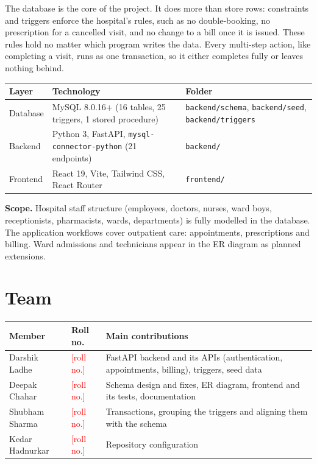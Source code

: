 \documentclass[11pt,a4paper]{article}
\newcommand{\TBD}[1]{\textcolor{red}{[#1]}}
\newcommand{\code}[1]{\texttt{#1}}
\begin{document}
The database is the core of the project. It does more than store rows: constraints and triggers enforce the hospital's rules, such as no double-booking, no prescription for a cancelled visit, and no change to a bill once it is issued. These rules hold no matter which program writes the data. Every multi-step action, like completing a visit, runs as one transaction, so it either completes fully or leaves nothing behind.

\begin{center}
\small
\begin{tabularx}{\textwidth}{l L L}
\toprule
\textbf{Layer} & \textbf{Technology} & \textbf{Folder} \\
\midrule
Database & MySQL 8.0.16+ (16 tables, 25 triggers, 1 stored procedure) & \code{backend/schema}, \code{backend/seed}, \code{backend/triggers} \\
Backend  & Python 3, FastAPI, \code{mysql-connector-python} (21 endpoints) & \code{backend/} \\
Frontend & React 19, Vite, Tailwind CSS, React Router & \code{frontend/} \\
\bottomrule
\end{tabularx}
\end{center}

\textbf{Scope.} Hospital staff structure (employees, doctors, nurses, ward boys, receptionists, pharmacists, wards, departments) is fully modelled in the database. The application workflows cover outpatient care: appointments, prescriptions and billing. Ward admissions and technicians appear in the ER diagram as planned extensions.

\section{Team}

\begin{center}
\small
\begin{tabularx}{\textwidth}{P{3.3cm} P{2.4cm} L}
\toprule
\textbf{Member} & \textbf{Roll no.} & \textbf{Main contributions} \\
\midrule
Darshik Ladhe   & \TBD{roll no.} & FastAPI backend and its APIs (authentication, appointments, billing), triggers, seed data \\
Deepak Chahar   & \TBD{roll no.} & Schema design and fixes, ER diagram, frontend and its tests, documentation \\
Shubham Sharma  & \TBD{roll no.} & Transactions, grouping the triggers and aligning them with the schema \\
Kedar Hadnurkar & \TBD{roll no.} & Repository configuration \\
\bottomrule
\end{tabularx}
\end{center}
\end{document}
